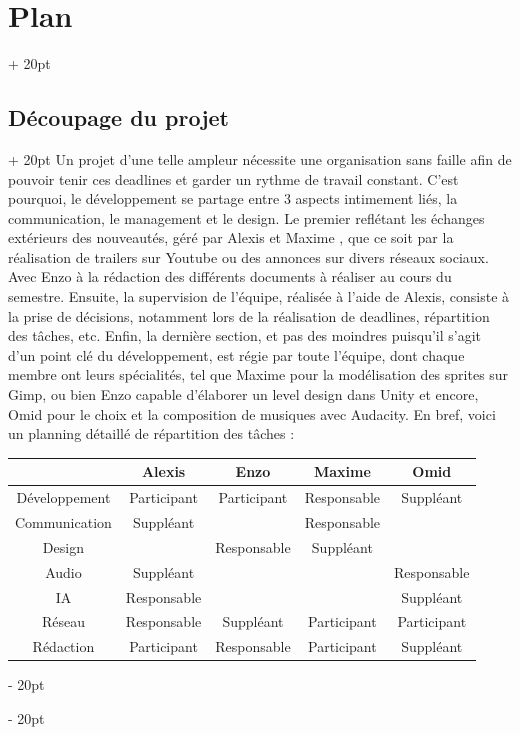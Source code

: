 \documentclass[a4paper, 12pt, twoside]{article}
\newcommand{\ind}[1][20pt]{\advance\leftskip + #1}
\newcommand{\deind}[1][20pt]{\advance\leftskip - #1}
\newenvironment{indt}[2][20pt]{#2 \par \ind[#1]}{\par \deind} %
\begin{document}
\begin{indt}{\section{Plan}}
        \begin{indt}{\subsection{Découpage du projet}}
            Un projet d'une telle ampleur nécessite une organisation sans faille afin de pouvoir tenir ces deadlines et garder un rythme de travail constant. C'est pourquoi, le développement se partage entre 3 aspects intimement liés, la communication, le management et le design. Le premier reflétant les échanges extérieurs des nouveautés, géré par Alexis et Maxime , que ce soit par la réalisation de trailers sur Youtube ou des annonces sur divers réseaux sociaux. Avec Enzo à la rédaction des différents documents à réaliser au cours du semestre. Ensuite, la supervision de l'équipe, réalisée à l'aide de Alexis, consiste à la prise de décisions, notamment lors de la réalisation de deadlines, répartition des tâches, etc. Enfin, la dernière section, et pas des moindres puisqu'il s'agit d'un point clé du développement, est régie par toute l'équipe, dont chaque membre ont leurs spécialités, tel que Maxime pour la modélisation des sprites sur Gimp, ou bien Enzo capable d'élaborer un level design dans Unity et encore, Omid pour le choix et la composition de musiques avec Audacity. En bref, voici un planning détaillé de répartition des tâches :
            \begin{center}
                \begin{tabular}{|c|c|c|c|c|}
                    \hline
                    & Alexis & Enzo & Maxime & Omid
                    \\
                    \hline
                    Développement & Participant & Participant & Responsable & Suppléant
                    \\
                    \hline
                    Communication & Suppléant & & Responsable &
                    \\
                    \hline
                    Design & & Responsable & Suppléant &
                    \\
                    \hline
                    Audio & Suppléant & & & Responsable
                    \\
                    \hline
                    IA & Responsable & & & Suppléant
                    \\
                    \hline
                    Réseau & Responsable & Suppléant & Participant & Participant
                    \\
                    \hline
                    Rédaction & Participant & Responsable & Participant & Suppléant
                    \\
                    \hline
                \end{tabular}
            \end{center}
        
        \end{indt}

    \end{indt}
\end{document}
